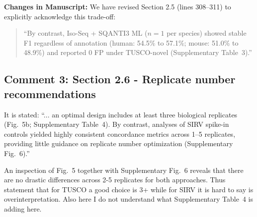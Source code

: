 \documentclass[11pt]{article}
\begin{document}
\begin{responseboxnew}
\vspace{0.3cm}
\textbf{Changes in Manuscript:} We have revised Section 2.5 (lines 308--311) to explicitly acknowledge this trade-off:

\begin{quote}
``By contrast, Iso-Seq + SQANTI3 ML ($n=1$ per species) showed stable F1 regardless of annotation (human: 54.5\% to 57.1\%; mouse: 51.0\% to 48.9\%) and reported 0 FP under TUSCO-novel (Supplementary Table~3).''
\end{quote}
\end{responseboxnew}

\subsection{Comment 3: Section 2.6 - Replicate number recommendations}

\begin{reviewercomment}
It is stated: ``... an optimal design includes at least three biological replicates (Fig.~5b; Supplementary Table~4). By contrast, analyses of SIRV spike-in controls yielded highly consistent concordance metrics across 1–5 replicates, providing little guidance on replicate number optimization (Supplementary Fig.~6).''

\vspace{0.2cm}
An inspection of Fig.~5 together with Supplementary Fig.~6 reveals that there are no drastic differences across 2-5 replicates for both approaches. Thus statement that for TUSCO a good choice is 3+ while for SIRV it is hard to say is overinterpretation. Also here I do not understand what Supplementary Table~4 is adding here.
\end{reviewercomment}
\end{document}
